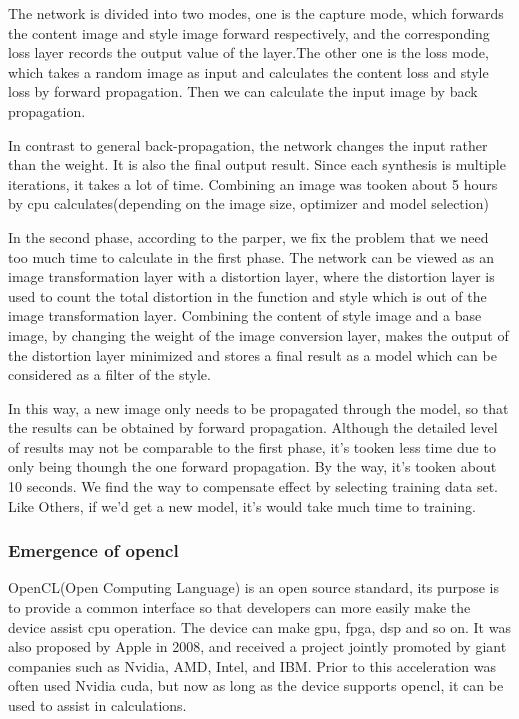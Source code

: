 The network is divided into two modes, one is the capture mode, which forwards the content image and style image forward respectively, and the corresponding loss layer records the output value of the layer.The other one is the loss mode, which takes a random image as input and calculates the content loss and style loss by forward propagation. Then we can calculate the input image by back propagation.

In contrast to general back-propagation, the network changes the input rather than the weight. It is also the final output result. Since each synthesis is multiple iterations, it takes a lot of time. Combining an image was tooken about 5 hours by cpu calculates(depending on the image size, optimizer and model selection)

In the second phase, according to the parper, we fix the problem that we need too much time to calculate in the first phase. The network can be viewed as an image transformation layer with a distortion layer, where the distortion layer is used to count the total distortion in the function and style which is out of the image transformation layer. Combining the content of style image and a base image, by changing the weight of the image conversion layer, makes the output of the distortion layer minimized and stores a final result as a model which can be considered as a filter of the style.

In this way, a new image only needs to be propagated through the model, so that the results can be obtained by forward propagation. Although the detailed level of results may not be comparable to the first phase, it's tooken less time due to only being thoungh the one forward propagation. By the way, it's tooken about 10 seconds. We find the way to compensate effect by selecting training data set. Like Others, if we'd get a new model, it's would take much time to training.

\subsubsection{Emergence of opencl}
 OpenCL(Open Computing Language) is an open source standard, its purpose is to provide a common interface so that developers can more easily make the device assist cpu operation. The device can make gpu, fpga, dsp and so on. It was also proposed by Apple in 2008, and received a project jointly promoted by giant companies such as Nvidia, AMD, Intel, and IBM. Prior to this acceleration was often used Nvidia cuda, but now as long as the device supports opencl, it can be used to assist in calculations.

